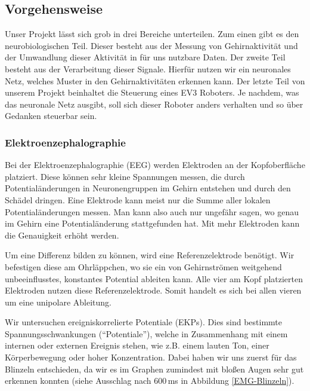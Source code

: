 \documentclass[11pt]{scrartcl}
\begin{document}
	\subsection{Vorgehensweise}

	Unser Projekt lässt sich grob in drei Bereiche unterteilen. Zum einen gibt es den neurobiologischen Teil. Dieser besteht aus der Messung von Gehirnaktivität und der Umwandlung dieser Aktivität in für uns nutzbare Daten. Der zweite Teil besteht aus der Verarbeitung dieser Signale. Hierfür nutzen wir ein neuronales Netz, welches Muster in den Gehirnaktivitäten erkennen kann. Der letzte Teil von unserem Projekt beinhaltet die Steuerung eines EV3 Roboters. Je nachdem, was das neuronale Netz ausgibt, soll sich dieser Roboter anders verhalten und so über Gedanken steuerbar sein.	

	\subsubsection{Elektroenzephalographie}

	Bei der Elektroenzephalographie (EEG) werden Elektroden an der Kopfoberfläche platziert. Diese können sehr kleine Spannungen messen, die durch Potentialänderungen in Neuronengruppen im Gehirn entstehen und durch den Schädel dringen. Eine Elektrode kann meist nur die Summe aller lokalen Potentialänderungen messen. Man kann also auch nur ungefähr sagen, wo genau im Gehirn eine Potentialänderung stattgefunden hat. Mit mehr Elektroden kann die Genauigkeit erhöht werden. \cite{wiki:EEG} \cite{Birbaumer2010}

	Um eine Differenz bilden zu können, wird eine Referenzelektrode benötigt. Wir befestigen diese am Ohrläppchen, wo sie ein von Gehirnströmen weitgehend unbeeinflusstes, konstantes Potential ableiten kann. Alle vier am Kopf platzierten Elektroden nutzen diese Referenzelektrode. Somit handelt es sich bei allen vieren um eine unipolare Ableitung. \cite{Praktikum}

	Wir untersuchen ereigniskorrelierte Potentiale (EKPs). Dies sind bestimmte Spannungsschwankungen (\enquote{Potentiale}), welche in Zusammenhang mit einem internen oder externen Ereignis stehen, wie z.B. einem lauten Ton, einer Körperbewegung oder hoher Konzentration. \cite{Birbaumer2010} \cite{Praktikum}
	Dabei haben wir uns zuerst für das Blinzeln entschieden, da wir es im Graphen zumindest mit bloßen Augen sehr gut erkennen konnten (siehe Ausschlag nach 600\,ms in Abbildung \ref{EMG-Blinzeln}).
\end{document}
